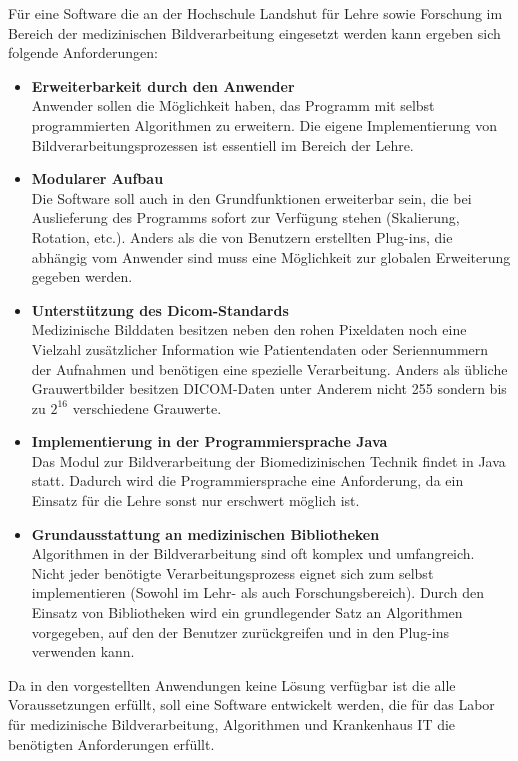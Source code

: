 Für eine Software die an der Hochschule Landshut für Lehre sowie Forschung im Bereich der medizinischen Bildverarbeitung eingesetzt werden kann ergeben sich folgende Anforderungen:

\begin{itemize}
\item \textbf{Erweiterbarkeit durch den Anwender} \\
	  Anwender sollen die Möglichkeit haben, das Programm mit selbst programmierten Algorithmen zu erweitern. Die eigene Implementierung von Bildverarbeitungsprozessen ist essentiell im Bereich der Lehre.
\item \textbf{Modularer Aufbau} \\
	  Die Software soll auch in den Grundfunktionen erweiterbar sein, die bei Auslieferung des Programms sofort zur Verfügung stehen (Skalierung, Rotation, etc.). Anders als die von Benutzern erstellten Plug-ins, die abhängig vom Anwender sind muss eine Möglichkeit zur globalen Erweiterung gegeben werden.
\item \textbf{Unterstützung des Dicom-Standards}\\
	  Medizinische Bilddaten besitzen neben den rohen Pixeldaten noch eine Vielzahl zusätzlicher Information wie Patientendaten oder Seriennummern der Aufnahmen und benötigen eine spezielle Verarbeitung. Anders als übliche Grauwertbilder besitzen DICOM-Daten unter Anderem nicht 255 sondern bis zu $2^{16}$ verschiedene Grauwerte.
\item \textbf{Implementierung in der Programmiersprache Java}\\
	  Das Modul zur Bildverarbeitung der Biomedizinischen Technik findet in Java statt. Dadurch wird die Programmiersprache eine Anforderung, da ein Einsatz für die Lehre sonst nur erschwert möglich ist.
\item \textbf{Grundausstattung an medizinischen Bibliotheken}\\
	  Algorithmen in der Bildverarbeitung sind oft komplex und umfangreich. Nicht jeder benötigte Verarbeitungsprozess eignet sich zum selbst implementieren (Sowohl im Lehr- als auch Forschungsbereich). Durch den Einsatz von Bibliotheken wird ein grundlegender Satz an Algorithmen vorgegeben, auf den der Benutzer zurückgreifen und in den Plug-ins verwenden kann.
\end{itemize}

Da in den vorgestellten Anwendungen keine Lösung verfügbar ist die alle Voraussetzungen erfüllt, soll eine Software entwickelt werden, die für das Labor für medizinische Bildverarbeitung, Algorithmen und Krankenhaus IT die benötigten Anforderungen erfüllt.